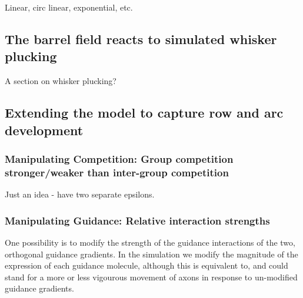 \documentclass[a4paper,11pt]{article}
\begin{document}
Linear, circ linear, exponential, etc.

\subsection*{The barrel field reacts to simulated whisker plucking}

A section on whisker plucking?




\subsection*{Extending the model to capture row and arc development}

\subsubsection*{Manipulating Competition: Group competition stronger/weaker than inter-group competition}

Just an idea - have two separate epsilons.

\subsubsection*{Manipulating Guidance: Relative interaction strengths}

One possibility is to modify the strength of the guidance interactions of the
two, orthogonal guidance gradients. In the simulation we modify the magnitude
of the expression of each guidance molecule, although this is equivalent to,
and could stand for a more or less vigourous movement of axons in response to
un-modified guidance gradients.
\end{document}
